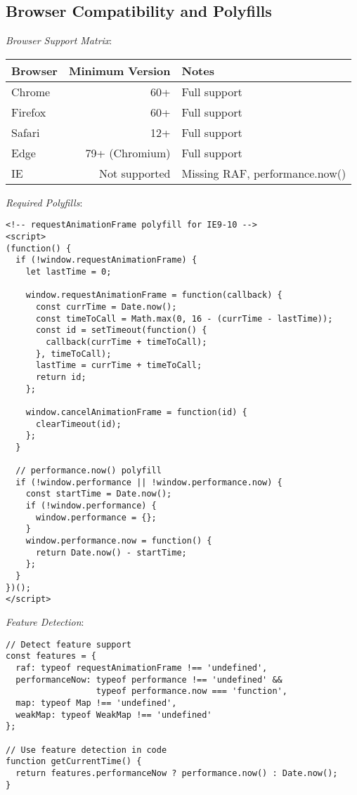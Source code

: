 \documentclass[11pt]{article}
\begin{document}
\subsection{Browser Compatibility and Polyfills}
\label{sec:org47659db}

\emph{Browser Support Matrix}:

\begin{center}
\begin{tabular}{lrl}
Browser & Minimum Version & Notes\\
\hline
Chrome & 60+ & Full support\\
Firefox & 60+ & Full support\\
Safari & 12+ & Full support\\
Edge & 79+ (Chromium) & Full support\\
IE & Not supported & Missing RAF, performance.now()\\
\end{tabular}
\end{center}

\emph{Required Polyfills}:

\begin{verbatim}
<!-- requestAnimationFrame polyfill for IE9-10 -->
<script>
(function() {
  if (!window.requestAnimationFrame) {
    let lastTime = 0;
    
    window.requestAnimationFrame = function(callback) {
      const currTime = Date.now();
      const timeToCall = Math.max(0, 16 - (currTime - lastTime));
      const id = setTimeout(function() {
        callback(currTime + timeToCall);
      }, timeToCall);
      lastTime = currTime + timeToCall;
      return id;
    };
    
    window.cancelAnimationFrame = function(id) {
      clearTimeout(id);
    };
  }
  
  // performance.now() polyfill
  if (!window.performance || !window.performance.now) {
    const startTime = Date.now();
    if (!window.performance) {
      window.performance = {};
    }
    window.performance.now = function() {
      return Date.now() - startTime;
    };
  }
})();
</script>
\end{verbatim}

\emph{Feature Detection}:

\begin{verbatim}
// Detect feature support
const features = {
  raf: typeof requestAnimationFrame !== 'undefined',
  performanceNow: typeof performance !== 'undefined' && 
                  typeof performance.now === 'function',
  map: typeof Map !== 'undefined',
  weakMap: typeof WeakMap !== 'undefined'
};

// Use feature detection in code
function getCurrentTime() {
  return features.performanceNow ? performance.now() : Date.now();
}
\end{verbatim}
\end{document}
